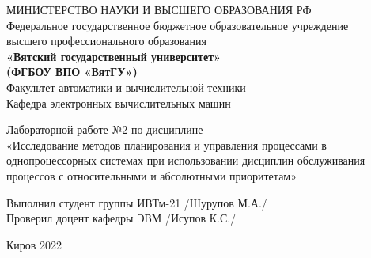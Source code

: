 \thispagestyle{empty}
\begin{center}
    МИНИСТЕРСТВО НАУКИ И ВЫСШЕГО ОБРАЗОВАНИЯ РФ\\
    Федеральное государственное бюджетное образовательное учреждение\\
    высшего профессионального образования\\
    {\bf«Вятский государственный университет»}\\
    {\bf(ФГБОУ ВПО «ВятГУ»)}\\
    Факультет автоматики и вычислительной техники\\
    Кафедра электронных вычислительных машин
\end{center}
\vfill %
\begin{center}
	Лабораторной работе №2 по дисциплине \\
    «Исследование методов планирования и управления процессами в однопроцессорных системах при использовании дисциплин обслуживания процессов с относительными и абсолютными приоритетам»
\end{center}

\vfill
\begin{flushleft}
    Выполнил студент группы ИВТм-21 \hrulefill /Шурупов М.А./\\
    Проверил доцент кафедры ЭВМ \hrulefill  /Исупов К.С./
\end{flushleft}
\vfill %

\begin{center}
    Киров 2022
\end{center}
\newpage

